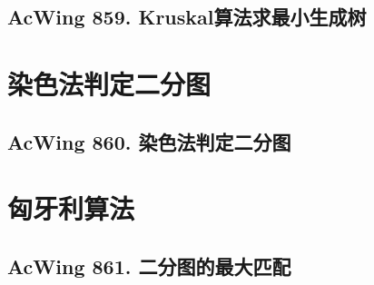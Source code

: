 \subsection{AcWing 859. Kruskal算法求最小生成树}

\section{染色法判定二分图}
\subsection{AcWing 860. 染色法判定二分图}

\section{匈牙利算法}
\subsection{AcWing 861. 二分图的最大匹配}